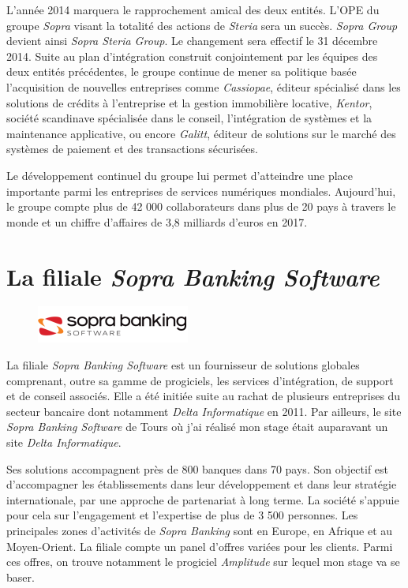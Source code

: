 \documentclass{polytech/polytech}
\begin{document}
L'année 2014 marquera le rapprochement amical des deux entités. L'OPE du groupe \textit{Sopra} visant la totalité des actions de \textit{Steria} sera un succès. \textit{Sopra Group} devient ainsi \textit{Sopra Steria Group}. Le changement sera effectif le 31 décembre 2014. Suite au plan d'intégration construit conjointement par les équipes des deux entités précédentes, le groupe continue de mener sa politique basée l'acquisition de nouvelles entreprises comme \textit{Cassiopae}, éditeur spécialisé dans les solutions de crédits à l'entreprise et la gestion immobilière locative, \textit{Kentor}, société scandinave spécialisée dans le conseil, l'intégration de systèmes et la maintenance applicative, ou encore \textit{Galitt}, éditeur de solutions sur le marché des systèmes de paiement et des transactions sécurisées.

Le développement continuel du groupe lui permet d'atteindre une place importante parmi les entreprises de services numériques mondiales. Aujourd'hui, le groupe compte plus de 42 000 collaborateurs dans plus de 20 pays à travers le monde et un chiffre d'affaires de 3,8 milliards d'euros en 2017.

\section{La filiale \textit{Sopra Banking Software}}

\begin{figure}
	\includegraphics[scale=1]{images/logoSopra}
\end{figure}

La filiale \textit{Sopra Banking Software} est un fournisseur de solutions globales comprenant, outre sa gamme de progiciels, les services d'intégration, de support et de conseil associés. Elle a été initiée suite au rachat de plusieurs entreprises du secteur bancaire dont notamment \textit{Delta Informatique} en 2011. Par ailleurs, le site \textit{Sopra Banking Software} de Tours où j'ai réalisé mon stage était auparavant un site \textit{Delta Informatique}.

Ses solutions accompagnent près de 800 banques dans 70 pays. Son objectif est d'accompagner les établissements dans leur développement et dans leur stratégie internationale, par une approche de partenariat à long terme. La société s'appuie pour cela sur l'engagement et l'expertise de plus de 3 500 personnes. Les principales zones d'activités de \textit{Sopra Banking} sont en Europe, en Afrique et au Moyen-Orient. La filiale compte un panel d'offres variées pour les clients. Parmi ces offres, on trouve notamment le progiciel \textit{Amplitude} sur lequel mon stage va se baser. 
\end{document}
